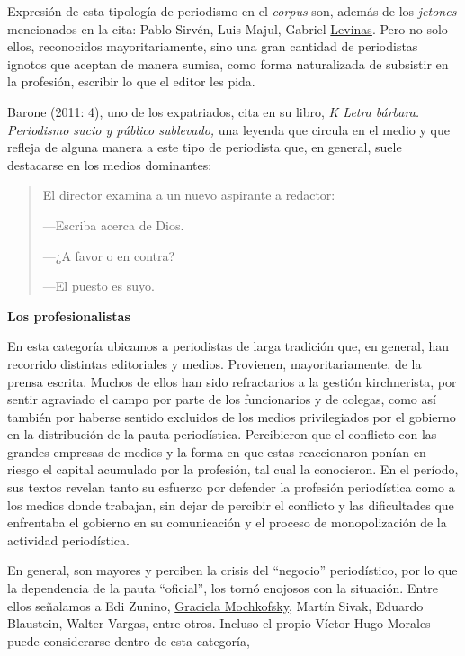 Expresión de esta tipología de periodismo en el \emph{corpus} son, además de los \emph{jetones} mencionados en la cita: Pablo Sirvén, Luis Majul, Gabriel \href{http://www.edicionesb-argentina.com/autor/levinas-daniel/}{Levinas}. Pero no solo ellos, reconocidos mayoritariamente, sino una gran cantidad de periodistas ignotos que aceptan de manera sumisa, como forma naturalizada de subsistir en la profesión, escribir lo que el editor les pida.

Barone (2011: 4), uno de los expatriados, cita en su libro, \emph{K Letra bárbara. Periodismo sucio y público sublevado,} una leyenda que circula en el medio y que refleja de alguna manera a este tipo de periodista que, en general, suele destacarse en los medios dominantes:

\begin{quote}
El director examina a un nuevo aspirante a redactor:

---Escriba acerca de Dios.

---¿A favor o en contra?

---El puesto es suyo.
\end{quote}

\textbf{Los profesionalistas}

En esta categoría ubicamos a periodistas de larga tradición que, en general, han recorrido distintas editoriales y medios. Provienen, mayoritariamente, de la prensa escrita. Muchos de ellos han sido refractarios a la gestión kirchnerista, por sentir agraviado el campo por parte de los funcionarios y de colegas, como así también por haberse sentido excluidos de los medios privilegiados por el gobierno en la distribución de la pauta periodística. Percibieron que el conflicto con las grandes empresas de medios y la forma en que estas reaccionaron ponían en riesgo el capital acumulado por la profesión, tal cual la conocieron. En el período, sus textos revelan tanto su esfuerzo por defender la profesión periodística como a los medios donde trabajan, sin dejar de percibir el conflicto y las dificultades que enfrentaba el gobierno en su comunicación y el proceso de monopolización de la actividad periodística.

En general, son mayores y perciben la crisis del \enquote{negocio} periodístico, por lo que la dependencia de la pauta \enquote{oficial}, los tornó enojosos con la situación. Entre ellos señalamos a Edi Zunino, \href{http://www.tematika.com/buscar.do?seccionDeBusqueda=En+Libros\&seccion=1\&claveDeBusqueda=porAutor\&txtencoded=Graciela+Mochkofsky\&idAutor=35432\&criterioDeOrden=2\&idSeccion=1\&texto=Graciela+Mochkofsky\&optSeleccionada=Autor\&idSeccionPropia=1}{Graciela Mochkofsky}, Martín Sivak, Eduardo Blaustein, Walter Vargas, entre otros. Incluso el propio Víctor Hugo Morales puede considerarse dentro de esta categoría,

